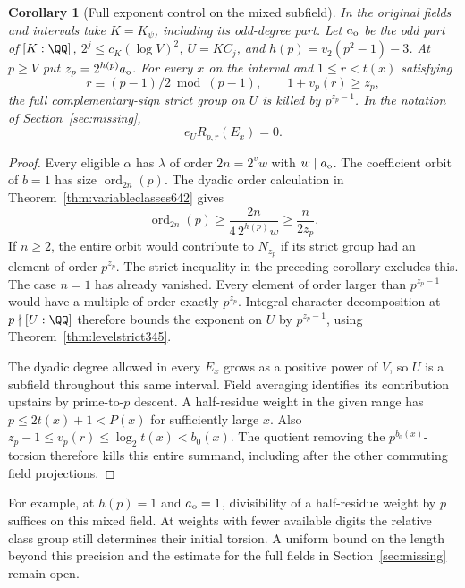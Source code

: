 \documentclass[a4paper,11pt]{article}
\newtheorem{corollary}[proposition]{Corollary}
\theoremstyle{definition}
\theoremstyle{remark}
\numberwithin{equation}{section}
\begin{document}
\begin{corollary}[Full exponent control on the mixed subfield]
\leavevmode\label{cor:mixedhalfexponent643}
In the original fields and intervals take \(K=K_\psi\), including
its odd-degree part. Let \(a_{\rm o}\) be the odd part of
\([K:\QQ]\), \(2^j\le c_K(\log V)^2\), \(U=KC_j\), and
\(h(p)=v_2(p^2-1)-3\). At \(p\ge V\) put \(z_p=2^{h(p)}a_{\rm o}\).
For every \(x\) on the interval and \(1\le r<t(x)\) satisfying
\[
       r\equiv (p-1)/2\bmod(p-1),\qquad
                         1+v_p(r)\ge z_p,
\]
the full complementary-sign strict group on \(U\) is killed
by \(p^{z_p-1}\). In the notation of Section~\ref{sec:missing},
\[
                         e_U R_{p,r}(E_x)=0 .
\]
\end{corollary}
\begin{proof}
Every eligible \(\alpha\) has \(\lambda\) of order \(2n=2^v w\)
with \(w\mid a_{\rm o}\). The coefficient orbit of \(b=1\)
has size \(\operatorname{ord}_{2n}(p)\). The dyadic order
calculation in Theorem~\ref{thm:variableclasses642} gives
\[
       \operatorname{ord}_{2n}(p)\ge
            \frac{2n}{4\,2^{h(p)}w}\ge\frac{n}{2z_p}.
\]
If \(n\ge2\), the entire orbit would contribute to \(N_{z_p}\)
if its strict group had an element of order \(p^{z_p}\).
The strict inequality in the preceding corollary excludes
this. The case \(n=1\) has already vanished. Every element of
order larger than \(p^{z_p-1}\) would have a multiple of order
exactly \(p^{z_p}\). Integral character decomposition at
\(p\nmid[U:\QQ]\) therefore bounds the exponent on \(U\)
by \(p^{z_p-1}\), using Theorem~\ref{thm:levelstrict345}.

The dyadic degree allowed in every \(E_x\) grows as a positive
power of \(V\), so \(U\) is a subfield throughout this same
interval. Field averaging identifies its contribution upstairs
by prime-to-\(p\) descent. A half-residue weight in the
given range has \(p\le 2t(x)+1<P(x)\) for sufficiently large
\(x\). Also \(z_p-1\le v_p(r)\le\log_2 t(x)<b_0(x)\).
The quotient removing the \(p^{b_0(x)}\)-torsion therefore
kills this entire summand, including after the other commuting
field projections.
\end{proof}

For example, at \(h(p)=1\) and \(a_{\rm o}=1\), divisibility
of a half-residue weight by \(p\) suffices on this mixed field.
At weights with fewer available digits the relative class group
still determines their initial torsion. A uniform bound on the
length beyond this precision and the estimate for the full
fields in Section~\ref{sec:missing} remain open.
\end{document}
